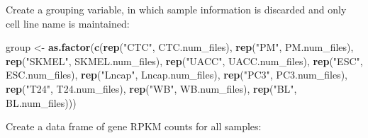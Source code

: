 \documentclass[]{article}
\newenvironment{Shaded}{\begin{snugshade}}{\end{snugshade}}
\newcommand{\KeywordTok}[1]{\textcolor[rgb]{0.13,0.29,0.53}{\textbf{#1}}}
\newcommand{\StringTok}[1]{\textcolor[rgb]{0.31,0.60,0.02}{#1}}
\newcommand{\NormalTok}[1]{#1}
\begin{document}
Create a grouping variable, in which sample information is discarded and
only cell line name is maintained:

\begin{Shaded}
\begin{Highlighting}[]
\NormalTok{group <-}\StringTok{ }\KeywordTok{as.factor}\NormalTok{(}\KeywordTok{c}\NormalTok{(}\KeywordTok{rep}\NormalTok{(}\StringTok{"CTC"}\NormalTok{, CTC.num_files), }\KeywordTok{rep}\NormalTok{(}\StringTok{"PM"}\NormalTok{, PM.num_files),}
                     \KeywordTok{rep}\NormalTok{(}\StringTok{"SKMEL"}\NormalTok{, SKMEL.num_files), }\KeywordTok{rep}\NormalTok{(}\StringTok{"UACC"}\NormalTok{, UACC.num_files),}
                     \KeywordTok{rep}\NormalTok{(}\StringTok{"ESC"}\NormalTok{, ESC.num_files), }\KeywordTok{rep}\NormalTok{(}\StringTok{"Lncap"}\NormalTok{, Lncap.num_files),}
                     \KeywordTok{rep}\NormalTok{(}\StringTok{"PC3"}\NormalTok{, PC3.num_files), }\KeywordTok{rep}\NormalTok{(}\StringTok{"T24"}\NormalTok{, T24.num_files),}
                     \KeywordTok{rep}\NormalTok{(}\StringTok{"WB"}\NormalTok{, WB.num_files), }\KeywordTok{rep}\NormalTok{(}\StringTok{"BL"}\NormalTok{, BL.num_files)))}
\end{Highlighting}
\end{Shaded}

Create a data frame of gene RPKM counts for all samples:
\end{document}
